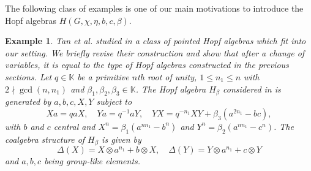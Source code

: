 \documentclass[11pt, twoside]{amsart}
\newtheorem{example}[theorem]{Example}
\theoremstyle{definition}
\newcommand{\KK}{\mathbb{K}}
\begin{document}
%
The following class of examples is one of our main motivations to introduce the Hopf algebras $H(G, \chi, \eta, b, c, \beta)$.
%
\begin{example}\label{example_sl2}
    Tan et al. studied in \cite{Wang-Wu-Tan} a class of pointed Hopf algebras which fit into our setting. We briefly revise their construction and show that after a change of variables, it is equal to the type of Hopf algebras constructed in the previous sections. Let $q \in \KK$ be a primitive $n$th root of unity, $1 \leq n_1 \leq n$ with $2 \nmid \gcd(n, n_1)$ and $\beta_1, \beta_2, \beta_3 \in \KK$. The Hopf algebra $H_\beta$ considered in \cite{Wang-Wu-Tan} is generated by $a, b, c, X, Y$ subject to 
    \[Xa = qaX,\quad Ya = q^{-1}aY,\quad YX = q^{-n_1}XY + \beta_3 (a^{2n_1} - bc),\]
    with $b$ and $c$ central and $X^n = \beta_1 (a^{nn_1} - b^n)$ and $Y^n = \beta_2 (a^{nn_1} - c^n)$. The coalgebra structure of $H_\beta$ is given by 
    \[\Delta(X) = X \otimes a^{n_1} + b \otimes X,\quad \Delta(Y) = Y \otimes a^{n_1} + c \otimes Y\]
    and $a, b, c$ being group-like elements.


\end{example}
\end{document}
